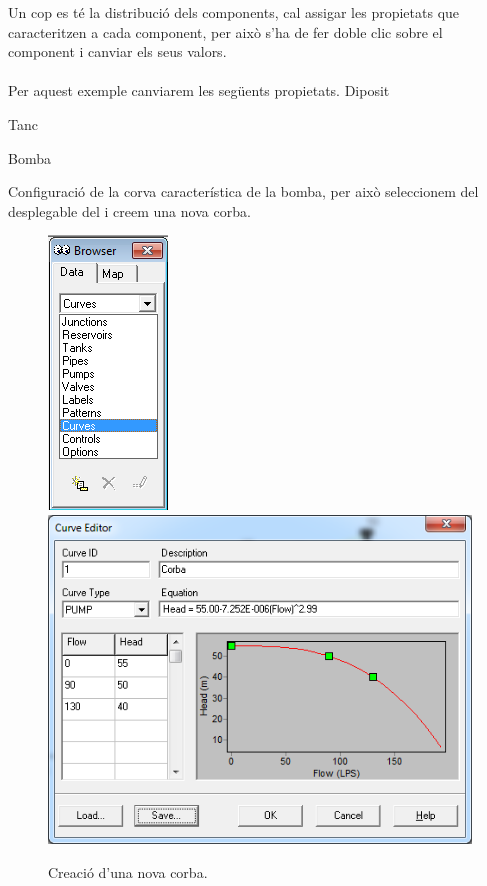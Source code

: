\documentclass[12pt]{article}
\begin{document}
Un cop es té la distribució dels components, cal assigar les propietats que caracteritzen a cada component, per això s'ha de fer doble clic sobre el component i canviar els seus valors.
\\\\Per aquest exemple canviarem les següents propietats.
Diposit

Tanc

Bomba

Configuració de la corva característica de la bomba, per això seleccionem  del desplegable del  i creem una nova corba.
\begin{figure}
	\centering
	\includegraphics[scale=0.7]{imatges/epanet/10.png}
	\includegraphics[scale=0.5]{imatges/epanet/11.png}
	\caption{Creació d'una nova corba.}
\end{figure}
\end{document}
